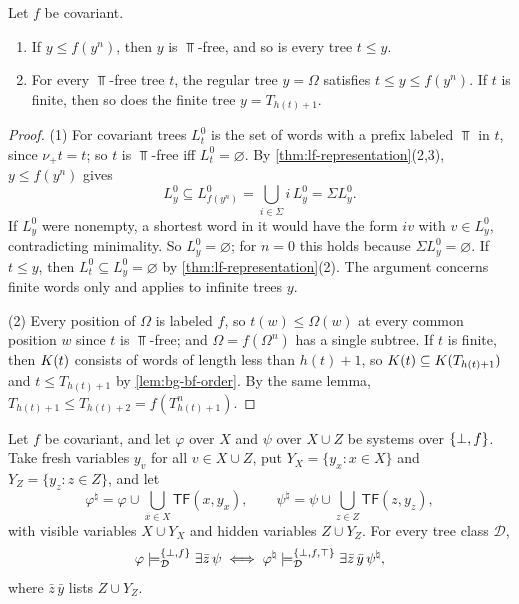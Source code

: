 \begin{lemma}\label{lem:tc-gadget}
Let $f$ be covariant.
\begin{enumerate}[leftmargin=*]
\item If $y\le f(y^n)$, then $y$ is $\Top$-free, and so is every tree $t\le y$.
\item For every $\Top$-free tree $t$, the regular tree $y=\Omega$ satisfies
  $t\le y\le f(y^n)$. If $t$ is finite, then so does the finite tree
  $y=T_{h(t)+1}$.
\end{enumerate}
\end{lemma}

\begin{proof}
(1) For covariant trees $L^0_t$ is the set of words with a prefix labeled
$\Top$ in $t$, since $\nu_+t=t$; so $t$ is $\Top$-free iff $L^0_t=\varnothing$.
By \cref{thm:lf-representation}(2,3), $y\le f(y^n)$ gives
\[
 L^0_y\subseteq L^0_{f(y^n)}=\bigcup_{i\in\Sigma}i\,L^0_y=\Sigma L^0_y .
\]
If $L^0_y$ were nonempty, a shortest word in it would have the form $iv$ with
$v\in L^0_y$, contradicting minimality. So $L^0_y=\varnothing$; for $n=0$ this
holds because $\Sigma L^0_y=\varnothing$. If $t\le y$, then
$L^0_t\subseteq L^0_y=\varnothing$ by \cref{thm:lf-representation}(2). The
argument concerns finite words only and applies to infinite trees $y$.

(2) Every position of $\Omega$ is labeled $f$, so $t(w)\le\Omega(w)$ at every
common position $w$ since $t$ is $\Top$-free; and $\Omega=f(\Omega^n)$ has a
single subtree. If $t$ is finite, then $K(t)$ consists of words of length
less than $h(t)+1$, so $K(t)\subseteq K(T_{h(t)+1})$ and $t\le
T_{h(t)+1}$ by \cref{lem:bg-bf-order}. By the same lemma,
$T_{h(t)+1}\le T_{h(t)+2}=f(T_{h(t)+1}^n)$.
\end{proof}

\begin{theorem}\label{thm:tc-gadget}
Let $f$ be covariant, and let $\varphi$ over $X$ and $\psi$ over $X\cup Z$ be
systems over $\{\bot,f\}$. Take fresh variables $y_v$ for all $v\in X\cup Z$, put
$Y_X=\{y_x:x\in X\}$ and $Y_Z=\{y_z:z\in Z\}$, and let
\[
 \varphi^\natural=\varphi\cup\bigcup_{x\in X}\mathsf{TF}(x,y_x),\qquad
 \psi^\natural=\psi\cup\bigcup_{z\in Z}\mathsf{TF}(z,y_z),
\]
with visible variables $X\cup Y_X$ and hidden variables $Z\cup Y_Z$. For every
tree class $\mathcal D$,
\[
 \varphi\models^{\{\bot,f\}}_{\mathcal D}\exists\bar z\,\psi
 \iff
 \varphi^\natural\models^{\{\bot,f,\top\}}_{\mathcal D}\exists\bar z\,\bar y\,\psi^\natural ,
\]
where $\bar z\,\bar y$ lists $Z\cup Y_Z$.
\end{theorem}

